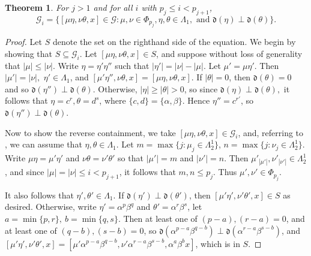 \documentclass[12pt]{amsart}
\newcommand{\sse}{\subseteq}
\newcommand{\mc}[1]{\mathcal{#1}}
\newcommand{\mf}[1]{\mathfrak{#1}}
\newcommand{\al}{\alpha}
\newcommand{\be}{\beta}
\renewcommand{\th}{\theta}
\newcommand{\La}{\Lambda}
\theoremstyle{plain} %
\newtheorem{Theorem}{Theorem}[section]
\theoremstyle{definition} %
\begin{document}
\begin{Theorem}\label{thm new G_i desc}
    For $j > 1$ and for all $i$ with $p_j \le i < p_{j+1}$, $$\mc{G}_i = \{ [\mu\eta, \nu \th, x] \in \mc{G} : \mu, \nu \in \Phi_{p_j}, \eta, \th \in \La_1, \text{ and } \mf{d}(\eta) \perp \mf{d}(\th) \}.$$
\end{Theorem}

\begin{proof}
    Let $S$ denote the set on the righthand side of the equation. We begin by showing that  $S \sse \mc{G}_i$. Let $[\mu \eta, \nu \th, x] \in S$, and suppose without loss of generality that $|\mu| \le |\nu|$. Write $\eta = \eta' \eta''$ such that $|\eta'| = |\nu| - |\mu|$. Let $\mu' = \mu \eta'$. Then $|\mu'| = |\nu|,$ $\eta' \in \La_1$, and $[\mu' \eta'', \nu \th, x] = [\mu \eta, \nu\th, x]$.
    If $|\th| = 0$, then $\mf{d}(\th) = 0$ and so $\mf{d}(\eta'') \perp \mf{d}(\th)$. Otherwise, $|\eta| \ge |\th| > 0$, so since $\mf{d}(\eta) \perp \mf{d}(\th),$ it follows that $\eta = c^r, \th = d^s$, where $\{c, d\} = \{\al, \be\}$. Hence $\eta'' = c^{r'}$, so $\mf{d}(\eta'') \perp \mf{d}(\th)$.

    Now to show the reverse containment, we take $[\mu \eta, \nu \th, x] \in \mc{G}_i$, and, referring to \cite[Theorem 3.18]{MS22}, we can assume that $\eta, \th \in \La_1$.
    Let $m = \max\{j : \mu_j \in \La_2^1\}$, $n = \max\{j: \nu_j \in \La_2^1\}$. Write $\mu \eta = \mu' \eta'$ and $\nu \th = \nu' \th'$ so that $|\mu'| = m$ and $|\nu'| = n$. Then $\mu'_{|\mu'|}, \nu'_{|\nu'|} \in \La_2^1$, and since $|\mu| = |\nu| \le i < p_{j+1}$, it follows that $m, n \le p_j$. Thus $\mu', \nu' \in \Phi_{p_j}$.

    It also follows that $\eta', \th' \in \La_1$. If $\mf{d}(\eta') \perp \mf{d}(\th')$, then $[\mu' \eta', \nu' \th', x] \in S$ as desired. Otherwise, write $\eta' = \al^p\be^q$ and $\th' = \al^r \be^s$, let $a = \min\{p,r\}, \ b=\min\{q, s\}$. Then at least one of $(p-a), (r-a) = 0$, and at least one of $(q-b), (s-b) = 0$, so $\mf{d}(\al^{p-a} \be^{q-b}) \perp \mf{d}(\al^{r-a} \be^{s-b})$, and $[\mu' \eta', \nu' \th', x] = [\mu'\al^{p-a} \be^{q-b}, \nu'\al^{r-a} \be^{s-b}, \al^a \be^b x]$, which is in $S$.
\end{proof}
\end{document}
